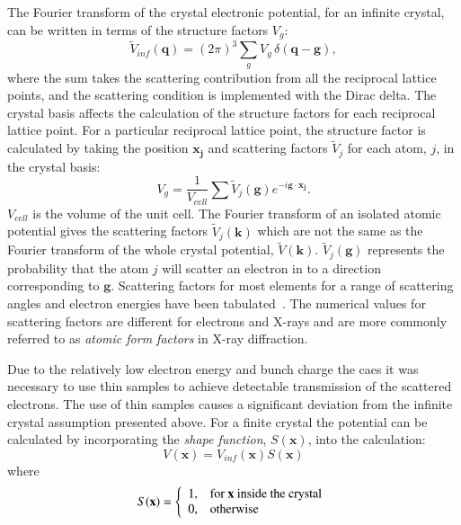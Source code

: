 The Fourier transform of the crystal electronic potential, for an infinite crystal, can be written in terms of the structure factors $V_g$:
\begin{equation}
\tilde{V}_{inf}(\mathbf{q}) = (2\pi)^3 \sum_g V_g \, \delta(\mathbf{q} - \mathbf{g}),
\end{equation}
where the sum takes the scattering contribution from all the reciprocal lattice points, and the scattering condition is implemented with the Dirac delta.
The crystal basis affects the calculation of the structure factors for each reciprocal lattice point.
For a particular reciprocal lattice point, the structure factor is calculated by taking the position $\mathbf{x_j}$ and scattering factors $\tilde{V}_j$ for each atom, $j$, in the crystal basis:
\begin{equation}
V_g = \frac{1}{V_{cell}}\sum\tilde{V}_j(\mathbf{g})e^{-i\mathbf{g}\cdot\mathbf{x_j}}.
\end{equation}
$V_{cell}$ is the volume of the unit cell.
The Fourier transform of an isolated atomic potential gives the scattering factors $\tilde{V}_j(\mathbf{k})$ which are not the same as the Fourier transform of the whole crystal potential, $\tilde{V}(\mathbf{k})$.
$\tilde{V}_j(\mathbf{g})$ represents the probability that the atom $j$ will scatter an electron in to a direction corresponding to $\mathbf{g}$.
Scattering factors for most elements for a range of scattering angles and electron energies have been tabulated~\cite{peng_electron_1999}.
The numerical values for scattering factors are different for electrons and X-rays and are more commonly referred to as \emph{atomic form factors} in X-ray diffraction.

Due to the relatively low electron energy and bunch charge the \gls{caes} it was necessary to use thin samples to achieve detectable transmission of the scattered electrons.
The use of thin samples causes a significant deviation from the infinite crystal assumption presented above.
For a finite crystal the potential can be calculated by incorporating the \emph{shape function}, $S(\mathbf{x})$, into the calculation:
\begin{equation}
V(\mathbf{x}) = V_{inf}(\mathbf{x})S(\mathbf{x})
\end{equation}
where
\begin{equation}
S(\mathbf{x}) = \left\{\begin{array}{l l}
1, & \text{for $\mathbf{x}$ inside the crystal} \\
0, & \text{otherwise}
\end{array}
\right.
\end{equation}

